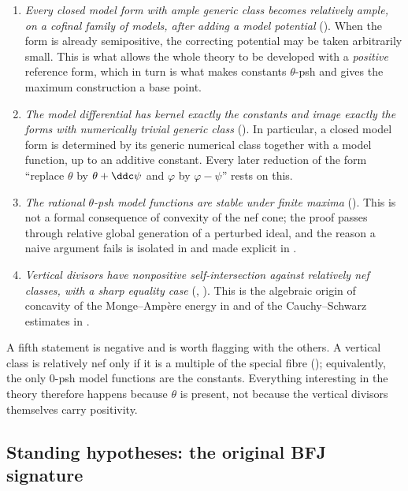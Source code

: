 \begin{enumerate}
\item \emph{Every closed model form with ample generic class becomes
 relatively ample, on a cofinal family of models, after adding a model
 potential} ().  When the form is
 already semipositive, the correcting potential may be taken arbitrarily
 small.  This is what allows the whole theory to be developed with a
 \emph{positive} reference form, which in turn is what makes constants
 $\theta$-psh and gives the maximum construction a base point.
\item \emph{The model differential has kernel exactly the constants and
 image exactly the forms with numerically trivial generic class}
 ().  In particular, a closed model form is
 determined by its generic numerical class together with a model function,
 up to an additive constant.  Every later reduction of the form ``replace
 $\theta$ by $\theta+\ddc\psi$ and $\varphi$ by $\varphi-\psi$''
 rests on this.
\item \emph{The rational $\theta$-psh model functions are stable under
 finite maxima} ().  This is not a formal consequence of
 convexity of the nef cone; the proof passes through relative global
 generation of a perturbed ideal, and the reason a naive argument fails is
 isolated in  and made explicit in
 .
\item \emph{Vertical divisors have nonpositive self-intersection against
 relatively nef classes, with a sharp equality case}
 (, ).  This is
 the algebraic origin of concavity of the Monge--Amp\`ere energy in
  and of the Cauchy--Schwarz estimates in
 .
\end{enumerate}

A fifth statement is negative and is worth flagging with the others.  A
vertical class is relatively nef only if it is a multiple of the special
fibre (); equivalently, the only
$0$-psh model functions are the constants.  Everything interesting in the
theory therefore happens because $\theta$ is present, not because the
vertical divisors themselves carry positivity.

\subsection{Standing hypotheses: the original BFJ signature}
\label{sec:ch20-hypotheses}

